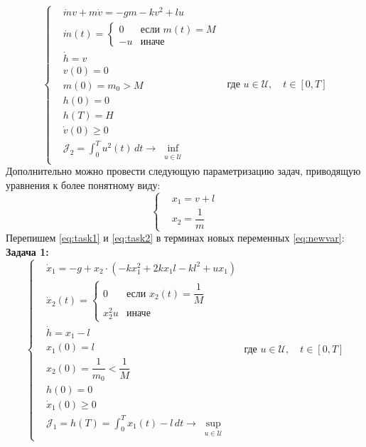 \documentclass[11pt, oneside, final]{article}
\theoremstyle{break}
\numberwithin{equation}{section}
\theoremstyle{plain}
\theoremstyle{definition}
\begin{document}
    \begin{equation}
        \label{eq:task2}
        \left\{
        \begin{aligned}
            &\dot mv + m \dot v = -gm - kv^2 + lu \\
            &\dot m(t) = \begin{cases} 0& \text{если $m(t) = M$} \\ 
                                 -u& \text{иначе}
                     \end{cases} \\
            &\dot h = v\\
            &v(0) = 0 \\
            &m(0) = m_0 > M \\
            &h(0) = 0 \\
            &h(T) = H \\
            &\dot v(0) \geqslant 0 \\
            &\mathcal{J}_2 = \int_0^T{u^2(t)\,dt} \rightarrow \inf_{\substack{u \in \mathcal{U}}}
        \end{aligned}
        \right.
        \text{ где }u \in \mathcal{U},\quad t \in [0, T]
    \end{equation}
    Дополнительно можно провести следующую параметризацию задач, приводящую уравнения к более понятному виду:
    \begin{equation}
    \label{eq:newvar}
    \left\{
    \begin{aligned}
        &x_1 = v + l \\
        &x_2 = \dfrac{1}{m}
    \end{aligned}
    \right.
    \end{equation}
    Перепишем \eqref{eq:task1} и \eqref{eq:task2} в терминах новых переменных \eqref{eq:newvar}:\\
    \textbf{Задача 1:}
    \begin{equation}
        \label{eq:task1_final}
        \left\{
        \begin{aligned}
            &\dot x_1 = -g + x_2 \cdot \left(-kx_1^2 + 2kx_1l - kl^2 + ux_1\right) \\
            &\dot x_2(t) = \begin{cases} 0& \text{если $x_2(t) = \dfrac{1}{M}$} \\ 
                                 x_2^2u& \text{иначе}
                     \end{cases} \\
            &\dot h = x_1 - l\\
            &x_1(0) = l \\
            &x_2(0)= \dfrac{1}{m_0} < \dfrac{1}{M} \\
            &h(0) = 0 \\
            &\dot x_1(0) \geqslant 0 \\
            &\mathcal{J}_1 = h(T) = \int_0^T{x_1(t) - l \, dt} \rightarrow \sup_{\substack{u \in \mathcal{U}}}
        \end{aligned}
        \right.
        \text{ где }u \in \mathcal{U},\quad t \in [0, T]
    \end{equation}
\end{document}
